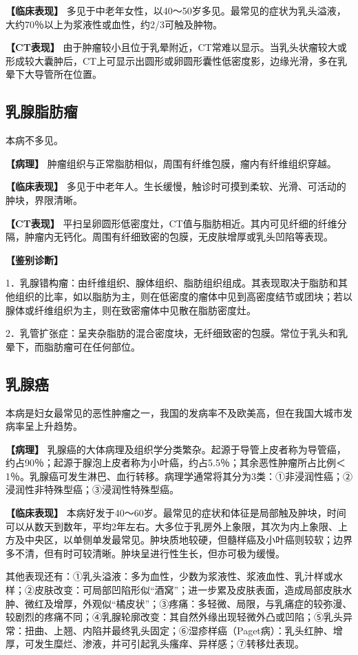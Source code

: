 \textbf{【临床表现】}
多见于中老年女性，以40～50岁多见。最常见的症状为乳头溢液，大约70％以上为浆液性或血性，约2/3可触及肿物。

\textbf{【CT表现】}
由于肿瘤较小且位于乳晕附近，CT常难以显示。当乳头状瘤较大或形成较大囊肿后，CT上可显示出圆形或卵圆形囊性低密度影，边缘光滑，多在乳晕下大导管所在位置。

\subsection{乳腺脂肪瘤}

本病不多见。

\textbf{【病理】}
肿瘤组织与正常脂肪相似，周围有纤维包膜，瘤内有纤维组织穿越。

\textbf{【临床表现】}
多见于中老年人。生长缓慢，触诊时可摸到柔软、光滑、可活动的肿块，界限清晰。

\textbf{【CT表现】}
平扫呈卵圆形低密度灶，CT值与脂肪相近。其内可见纤细的纤维分隔，肿瘤内无钙化。周围有纤细致密的包膜，无皮肤增厚或乳头凹陷等表现。

\textbf{【鉴别诊断】}

1．乳腺错构瘤：由纤维组织、腺体组织、脂肪组织组成。其表现取决于脂肪和其他组织的比率，如以脂肪为主，则在低密度的瘤体中见到高密度结节或团块；若以腺体或纤维组织为主，则在致密瘤体中见散在脂肪密度灶。

2．乳管扩张症：呈夹杂脂肪的混合密度块，无纤细致密的包膜。常位于乳头和乳晕下，而脂肪瘤可在任何部位。

\subsection{乳腺癌}

本病是妇女最常见的恶性肿瘤之一，我国的发病率不及欧美高，但在我国大城市发病率呈上升趋势。

\textbf{【病理】}
乳腺癌的大体病理及组织学分类繁杂。起源于导管上皮者称为导管癌，约占90％；起源于腺泡上皮者称为小叶癌，约占5.5％；其余恶性肿瘤所占比例＜1％。乳腺癌可发生淋巴、血行转移。病理学通常将其分为3类：①非浸润性癌；②浸润性非特殊型癌；③浸润性特殊型癌。

\textbf{【临床表现】}
本病好发于40～60岁。最常见的症状和体征是局部触及肿块，时间可以从数天到数年，平均2年左右。大多位于乳房外上象限，其次为内上象限、上方及中央区，以单侧单发最常见。肿块质地较硬，但髓样癌及小叶癌则较软；边界多不清，但有时可较清晰。肿块呈进行性生长，但亦可极为缓慢。

其他表现还有：①乳头溢液：多为血性，少数为浆液性、浆液血性、乳汁样或水样；②皮肤改变：可局部凹陷形似“酒窝”；进一步累及皮肤表面，造成局部皮肤水肿、微红及增厚，外观似“橘皮状”；③疼痛：多轻微、局限，与乳痛症的较弥漫、较剧烈的疼痛不同；④乳腺轮廓改变：其自然外缘出现轻微外凸或凹陷；⑤乳头异常：扭曲、上翘、内陷并最终乳头固定；⑥湿疹样癌（Paget病）：乳头红肿、增厚，可发生糜烂、渗液，并可引起乳头瘙痒、异样感；⑦转移灶表现。

